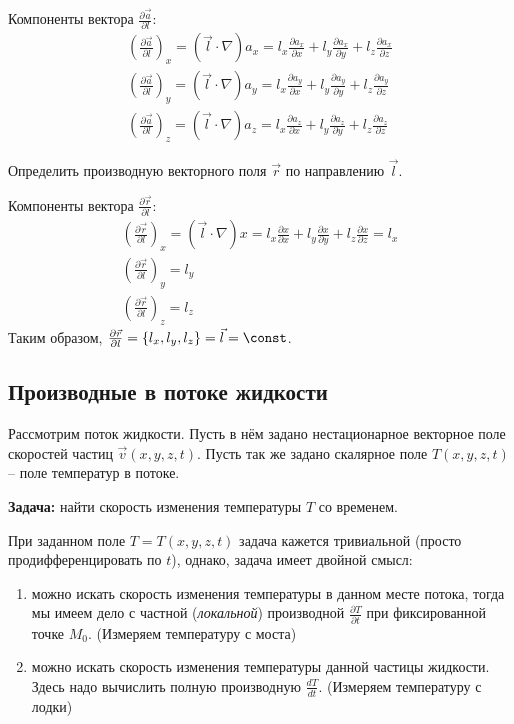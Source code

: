 	Компоненты вектора \( \frac{\partial \vec{a}}{\partial l} \):
	\begin{align}
		\left(\frac{\partial \vec{a}}{\partial l}\right)_x = (\vec{l}\cdot\nabla)a_x = l_x\frac{\partial a_x}{\partial x} + l_y\frac{\partial a_x}{\partial y} + l_z\frac{\partial a_x}{\partial z} \nonumber \\
		\left(\frac{\partial \vec{a}}{\partial l}\right)_y = (\vec{l}\cdot\nabla)a_y = l_x\frac{\partial a_y}{\partial x} + l_y\frac{\partial a_y}{\partial y} + l_z\frac{\partial a_y}{\partial z} \nonumber \\
		\left(\frac{\partial \vec{a}}{\partial l}\right)_z = (\vec{l}\cdot\nabla)a_z = l_x\frac{\partial a_z}{\partial x} + l_y\frac{\partial a_z}{\partial y} + l_z\frac{\partial a_z}{\partial z} \nonumber
	\end{align}
	
	\begin{example}
	Определить производную векторного поля \( \vec{r} \) по направлению \( \vec{l} \).
	\end{example}
	
	\begin{solution}
	Компоненты вектора \( \frac{\partial \vec{r}}{\partial l} \):
	\begin{align}
		\left(\frac{\partial \vec{r}}{\partial l}\right)_x = (\vec{l}\cdot\nabla)x = l_x\frac{\partial x}{\partial x} + l_y\frac{\partial x}{\partial y} + l_z\frac{\partial x}{\partial z} = l_x \nonumber \\
		\left(\frac{\partial \vec{r}}{\partial l}\right)_y = l_y \nonumber \\
		\left(\frac{\partial \vec{r}}{\partial l}\right)_z = l_z \nonumber
	\end{align}
	Таким образом, \( \frac{\partial \vec{r}}{\partial l} = \{ l_x, l_y, l_z \} = \vec{l} = \const \).
	\end{solution}
	
\subsection{Производные в потоке жидкости}

	Рассмотрим поток жидкости. Пусть в нём задано нестационарное векторное поле скоростей частиц \( \vec{v}(x, y, z, t) \). Пусть так же задано скалярное поле \( T(x, y, z, t) \) -- поле температур в потоке.
	
	\textbf{Задача:} найти скорость изменения температуры \( T \) со временем.
	
	При заданном поле \( T = T(x, y, z, t) \) задача кажется тривиальной (просто продифференцировать по \( t \)), однако, задача имеет двойной смысл:
	\begin{enumerate}
	\item
		можно искать скорость изменения температуры в данном месте потока, тогда мы имеем дело с частной (\textit{локальной}) производной \( \frac{\partial T}{\partial t} \) при фиксированной точке \( M_0 \). (Измеряем температуру с моста)
	\item
		можно искать скорость изменения температуры данной частицы жидкости. Здесь надо вычислить полную производную \( \frac{dT}{dt} \). (Измеряем температуру с лодки)
	\end{enumerate}
	
